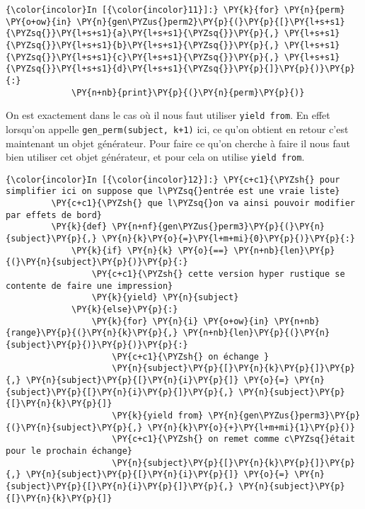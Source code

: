     \begin{Verbatim}[commandchars=\\\{\},frame=single,framerule=0.3mm,rulecolor=\color{cellframecolor}]
{\color{incolor}In [{\color{incolor}11}]:} \PY{k}{for} \PY{n}{perm} \PY{o+ow}{in} \PY{n}{gen\PYZus{}perm2}\PY{p}{(}\PY{p}{[}\PY{l+s+s1}{\PYZsq{}}\PY{l+s+s1}{a}\PY{l+s+s1}{\PYZsq{}}\PY{p}{,} \PY{l+s+s1}{\PYZsq{}}\PY{l+s+s1}{b}\PY{l+s+s1}{\PYZsq{}}\PY{p}{,} \PY{l+s+s1}{\PYZsq{}}\PY{l+s+s1}{c}\PY{l+s+s1}{\PYZsq{}}\PY{p}{,} \PY{l+s+s1}{\PYZsq{}}\PY{l+s+s1}{d}\PY{l+s+s1}{\PYZsq{}}\PY{p}{]}\PY{p}{)}\PY{p}{:}
             \PY{n+nb}{print}\PY{p}{(}\PY{n}{perm}\PY{p}{)}
\end{Verbatim}


    On est exactement dans le cas où il nous faut utiliser
\texttt{yield\ from}. En effet lorsqu'on appelle
\texttt{gen\_perm(subject,\ k+1)} ici, ce qu'on obtient en retour c'est
maintenant un objet générateur. Pour faire ce qu'on cherche à faire il
nous faut bien utiliser cet objet générateur, et pour cela on utilise
\texttt{yield\ from}.

    \begin{Verbatim}[commandchars=\\\{\},frame=single,framerule=0.3mm,rulecolor=\color{cellframecolor}]
{\color{incolor}In [{\color{incolor}12}]:} \PY{c+c1}{\PYZsh{} pour simplifier ici on suppose que l\PYZsq{}entrée est une vraie liste}
         \PY{c+c1}{\PYZsh{} que l\PYZsq{}on va ainsi pouvoir modifier par effets de bord}
         \PY{k}{def} \PY{n+nf}{gen\PYZus{}perm3}\PY{p}{(}\PY{n}{subject}\PY{p}{,} \PY{n}{k}\PY{o}{=}\PY{l+m+mi}{0}\PY{p}{)}\PY{p}{:}
             \PY{k}{if} \PY{n}{k} \PY{o}{==} \PY{n+nb}{len}\PY{p}{(}\PY{n}{subject}\PY{p}{)}\PY{p}{:}
                 \PY{c+c1}{\PYZsh{} cette version hyper rustique se contente de faire une impression}
                 \PY{k}{yield} \PY{n}{subject}
             \PY{k}{else}\PY{p}{:}
                 \PY{k}{for} \PY{n}{i} \PY{o+ow}{in} \PY{n+nb}{range}\PY{p}{(}\PY{n}{k}\PY{p}{,} \PY{n+nb}{len}\PY{p}{(}\PY{n}{subject}\PY{p}{)}\PY{p}{)}\PY{p}{:}
                     \PY{c+c1}{\PYZsh{} on échange }
                     \PY{n}{subject}\PY{p}{[}\PY{n}{k}\PY{p}{]}\PY{p}{,} \PY{n}{subject}\PY{p}{[}\PY{n}{i}\PY{p}{]} \PY{o}{=} \PY{n}{subject}\PY{p}{[}\PY{n}{i}\PY{p}{]}\PY{p}{,} \PY{n}{subject}\PY{p}{[}\PY{n}{k}\PY{p}{]}
                     \PY{k}{yield from} \PY{n}{gen\PYZus{}perm3}\PY{p}{(}\PY{n}{subject}\PY{p}{,} \PY{n}{k}\PY{o}{+}\PY{l+m+mi}{1}\PY{p}{)}
                     \PY{c+c1}{\PYZsh{} on remet comme c\PYZsq{}était pour le prochain échange}
                     \PY{n}{subject}\PY{p}{[}\PY{n}{k}\PY{p}{]}\PY{p}{,} \PY{n}{subject}\PY{p}{[}\PY{n}{i}\PY{p}{]} \PY{o}{=} \PY{n}{subject}\PY{p}{[}\PY{n}{i}\PY{p}{]}\PY{p}{,} \PY{n}{subject}\PY{p}{[}\PY{n}{k}\PY{p}{]}
\end{Verbatim}


